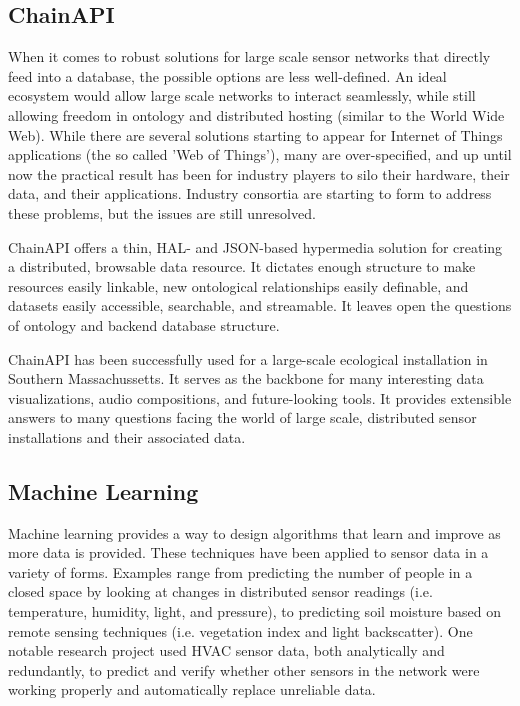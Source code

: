 \subsection{ChainAPI}

When it comes to robust solutions for large scale sensor networks that directly feed into a database, the possible options are less well-defined.  An ideal ecosystem would allow large scale networks to interact seamlessly, while still allowing freedom in ontology and distributed hosting (similar to the World Wide Web).  While there are several solutions starting to appear for Internet of Things applications (the so called 'Web of Things'), many are over-specified, and up until now the practical result has been for industry players to silo their hardware, their data, and their applications.  Industry consortia are starting to form to address these problems,  but the issues are still unresolved.

ChainAPI offers a thin, HAL- and JSON-based hypermedia solution for creating a distributed, browsable data resource.  It dictates enough structure to make resources easily linkable, new ontological relationships easily definable, and datasets easily accessible, searchable, and streamable.  It leaves open the questions of ontology and backend database structure. 

ChainAPI has been successfully used for a large-scale ecological installation in Southern Massachussetts.  It serves as the backbone for many interesting data visualizations, audio compositions, and future-looking tools.  It provides extensible answers to many questions facing the world of large scale, distributed sensor installations and their associated data.

\subsection{Machine Learning}

Machine learning provides a way to design algorithms that learn and improve as more data is provided.  These techniques have been applied to sensor data in a variety of forms.  Examples range from predicting the number of people in a closed space by looking at changes in distributed sensor readings (i.e. temperature, humidity, light, and pressure), to predicting soil moisture based on remote sensing techniques (i.e. vegetation index and light backscatter).  One notable research project used HVAC sensor data, both analytically and redundantly, to predict and verify whether other sensors in the network were working properly and automatically replace unreliable data.

